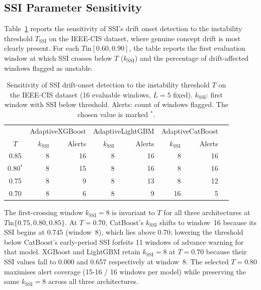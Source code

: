 \documentclass[pdflatex,sn-mathphys-num]{sn-jnl}
\theoremstyle{thmstyleone}
\theoremstyle{thmstyletwo}
\theoremstyle{thmstylethree}
\begin{document}
\subsection{SSI Parameter Sensitivity}\label{sec:res:sensitivity}

Table~\ref{tab:tau_sensitivity} reports the sensitivity of SSI's drift onset
detection to the instability threshold $T_{\mathrm{SSI}}$ on the IEEE-CIS
dataset, where genuine concept drift is most clearly present. For each
$T \mathbin{\mathrm{in}} [0.60, 0.90]$, the table reports the first evaluation window at
which SSI crosses below $T$ ($k_{\mathrm{SSI}}$) and the percentage of
drift-affected windows flagged as unstable.

\begin{table}[t]
  \caption{Sensitivity of SSI drift-onset detection to the instability
           threshold $T$ on the IEEE-CIS dataset (16 evaluable windows,
           $L=5$ fixed). $k_{\mathrm{SSI}}$: first window with SSI below
           threshold. Alerts: count of windows flagged. The chosen value
           is marked $^*$.}
  \label{tab:tau_sensitivity}
  \centering\footnotesize
  \begin{tabular}{crrrrrrr}
    \toprule
    & \multicolumn{2}{c}{AdaptiveXGBoost} & \multicolumn{2}{c}{AdaptiveLightGBM}
    & \multicolumn{2}{c}{AdaptiveCatBoost} \\
    \cmidrule(lr){2-3}\cmidrule(lr){4-5}\cmidrule(lr){6-7}
    $T$ & $k_{\mathrm{SSI}}$ & Alerts & $k_{\mathrm{SSI}}$ & Alerts
           & $k_{\mathrm{SSI}}$ & Alerts \\
    \midrule
    0.85     & 8 & 16 & 8 & 16 & 8  & 16 \\
    0.80$^*$ & 8 & 15 & 8 & 16 & 8  & 16 \\
    0.75     & 8 &  9 & 8 & 13 & 8  & 12 \\
    0.70     & 8 &  6 & 8 &  9 & 16 &  5 \\
    \bottomrule
  \end{tabular}
\end{table}

The first-crossing window $k_{\mathrm{SSI}} = 8$ is invariant to $T$ for
all three architectures at $T \mathbin{\mathrm{in}} \{0.75, 0.80, 0.85\}$. At $T = 0.70$,
CatBoost's $k_{\mathrm{SSI}}$ shifts to window~16 because its SSI begins at
$0.745$ (window~8), which lies above 0.70; lowering the threshold below
CatBoost's early-period SSI forfeits 11 windows of advance warning for that
model. XGBoost and LightGBM retain $k_{\mathrm{SSI}} = 8$ at $T = 0.70$
because their SSI values fall to 0.000 and 0.657 respectively at window~8.
The selected $T = 0.80$ maximises alert coverage (15-16 / 16 windows per
model) while preserving the same $k_{\mathrm{SSI}} = 8$ across all three
architectures.
\end{document}
